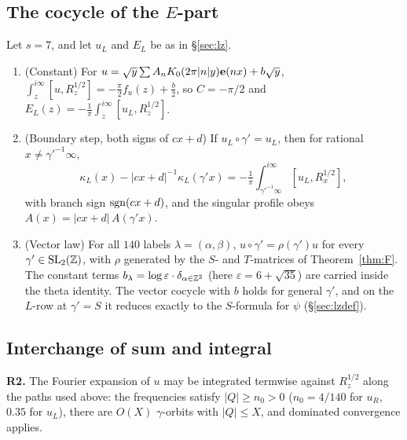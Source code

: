\subsection{The cocycle of the $E$-part}\label{sec:coc}
\begin{theorem}\label{thm:coc5}
Let $s=7$, and let $u_L$ and $E_L$ be as in \S\ref{sec:lz}.
\begin{enumerate}[label=(\roman*)]
\item (Constant) For $u=\sqrt y\sum A_nK_0(2\pi|n|y)\mathbf{e}(nx)+b\sqrt y$, $\int_z^{i\infty}[u,R_z^{1/2}]=-\tfrac\pi2 f_u(z)+\tfrac b2$, so $C=-\pi/2$ and $E_L(z)=-\tfrac1\pi\int_z^{i\infty}[u_L,R_z^{1/2}]$.
\item (Boundary step, both signs of $cx+d$) If $u_L\circ\gamma'=u_L$, then for rational $x\neq\gamma'^{-1}\infty$,
\[\kappa_L(x)-|cx+d|^{-1}\kappa_L(\gamma'x)=-\tfrac1\pi\int_{\gamma'^{-1}\infty}^{i\infty}[u_L,R_x^{1/2}],\]
with branch sign $\operatorname{sgn}(cx+d)$, and the singular profile obeys $A(x)=|cx+d|\,A(\gamma'x)$.
\item (Vector law) For all $140$ labels $\lambda=(\alpha,\beta)$, $u\circ\gamma'=\rho(\gamma')u$ for every $\gamma'\in\mathrm{SL}_2(\mathbb{Z})$, with $\rho$ generated by the $S$- and $T$-matrices of
Theorem~\ref{thm:F}. The constant terms $b_\lambda=\log\varepsilon\cdot\delta_{\alpha\in\mathbb{Z}^2}$ (here $\varepsilon=6+\sqrt{35}$) are carried inside the theta identity. The vector cocycle with $b$ holds for general $\gamma'$, and on the $L$-row at $\gamma'=S$ it reduces exactly to the $S$-formula for $\psi$ (\S\ref{sec:lzdef}).
\end{enumerate}
\end{theorem}

\subsection{Interchange of sum and integral}\label{sec:R2}
\textbf{R2.} The Fourier expansion of $u$ may be integrated termwise against $R_z^{1/2}$ along the paths used above: the frequencies satisfy
$|Q|\ge n_0>0$ ($n_0=4/140$ for $u_R$, $0.35$ for $u_L$), there are $O(X)$ $\gamma$-orbits with $|Q|\le X$, and dominated convergence applies.
